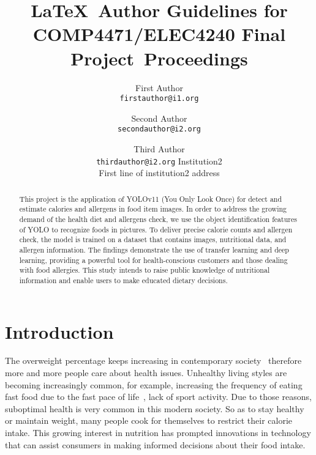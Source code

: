\documentclass[10pt,twocolumn,letterpaper]{article}
\def\confName{COMP4471/ELEC4240 Final Project}
\begin{document}
\title{\LaTeX\ Author Guidelines for \confName~Proceedings}

\author{
    First Author\\
    {\tt\small firstauthor@i1.org}
    \and
    Second Author\\
    {\tt\small secondauthor@i2.org}
    \and
    Third Author\\
    {\tt\small thirdauthor@i2.org}
    Institution2\\
    First line of institution2 address
}
\maketitle


\begin{abstract}
        This project is the application of YOLOv11 (You Only Look Once) for detect and estimate calories and allergens in food item images.
        In order to address the growing demand of the health diet and allergens check, we use the object identification features of YOLO to recognize foods in pictures.
        To deliver precise calorie counts and allergen check, the model is trained on a dataset that contains images, nutritional data, and allergen information.
        The findings demonstrate the use of transfer learning and deep learning, providing a powerful tool for health-conscious customers and those dealing with food allergies.
        This study intends to raise public knowledge of nutritional information and enable users to make educated dietary decisions.
\end{abstract}


\section{Introduction}
\label{sec:intro}

The overweight percentage keeps increasing in contemporary society~\cite{nihoverweightobesity} therefore more and more people care about health issues.
Unhealthy living styles are becoming increasingly common, for example, increasing the frequency of eating fast food due to the fast pace of life~\cite{worldpopulationreviewfastfood}, lack of sport activity.
Due to those reasons, suboptimal health is very common in this modern society.
So as to stay healthy or maintain weight, many people cook for themselves to restrict their calorie intake.
This growing interest in nutrition has prompted innovations in technology that can assist consumers in making informed decisions about their food intake.
\end{document}
